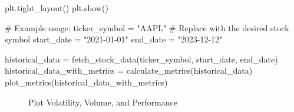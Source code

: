 \documentclass[
  letterpaper,
  DIV=11,
  numbers=noendperiod]{scrreprt}
\newenvironment{Shaded}{\begin{snugshade}}{\end{snugshade}}
\newcommand{\CommentTok}[1]{\textcolor[rgb]{0.37,0.37,0.37}{#1}}
\newcommand{\NormalTok}[1]{\textcolor[rgb]{0.00,0.23,0.31}{#1}}
\newcommand{\OperatorTok}[1]{\textcolor[rgb]{0.37,0.37,0.37}{#1}}
\newcommand{\StringTok}[1]{\textcolor[rgb]{0.13,0.47,0.30}{#1}}
\begin{document}
\begin{Shaded}
\begin{Highlighting}[]
\NormalTok{    plt.tight\_layout()}
\NormalTok{    plt.show()}

\CommentTok{\# Example usage:}
\NormalTok{ticker\_symbol }\OperatorTok{=} \StringTok{"AAPL"}  \CommentTok{\# Replace with the desired stock symbol}
\NormalTok{start\_date }\OperatorTok{=} \StringTok{"2021{-}01{-}01"}
\NormalTok{end\_date }\OperatorTok{=} \StringTok{"2023{-}12{-}12"}

\NormalTok{historical\_data }\OperatorTok{=}\NormalTok{ fetch\_stock\_data(ticker\_symbol, start\_date, end\_date)}
\NormalTok{historical\_data\_with\_metrics }\OperatorTok{=}\NormalTok{ calculate\_metrics(historical\_data)}
\NormalTok{plot\_metrics(historical\_data\_with\_metrics)}
\end{Highlighting}
\end{Shaded}

\begin{figure}[H]


\caption{\label{fig-plot}Plot Volatility, Volume, and Performance}

\end{figure}%
\end{document}
